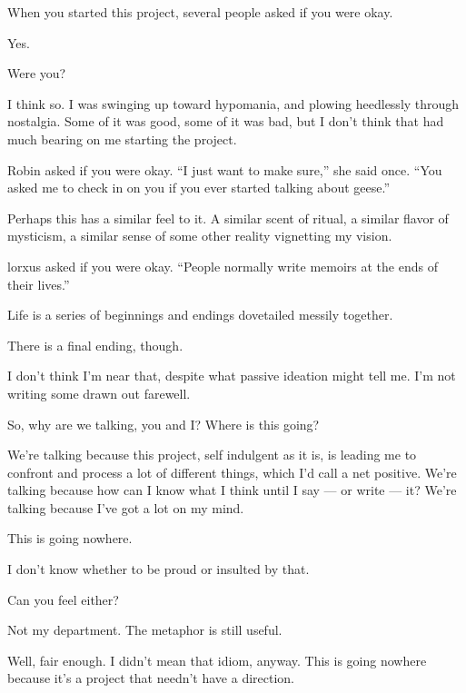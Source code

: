 \begin{ally}
When you started this project, several people asked if you were okay.
\end{ally}
Yes.

\begin{ally}
Were you?
\end{ally}
I think so. I was swinging up toward hypomania, and plowing heedlessly through nostalgia. Some of it was good, some of it was bad, but I don't think that had much bearing on me starting the project.

\begin{ally}
Robin asked if you were okay. ``I just want to make sure,'' she said once. ``You asked me to check in on you if you ever started talking about geese.''
\end{ally}
Perhaps this has a similar feel to it. A similar scent of ritual, a similar flavor of mysticism, a similar sense of some other reality vignetting my vision.

\begin{ally}
lorxus asked if you were okay. ``People normally write memoirs at the ends of their lives.''
\end{ally}
Life is a series of beginnings and endings dovetailed messily together.

\begin{ally}
There is a final ending, though.
\end{ally}
I don't think I'm near that, despite what passive ideation might tell me. I'm not writing some drawn out farewell.

\begin{ally}
So, why are we talking, you and I? Where is this going?
\end{ally}
We're talking because this project, self indulgent as it is, is leading me to confront and process a lot of different things, which I'd call a net positive. We're talking because how can I know what I think until I say --- or write --- it? We're talking because I've got a lot on my mind.

This is going nowhere.

\begin{ally}
I don't know whether to be proud or insulted by that.
\end{ally}
Can you feel either?

\begin{ally}
Not my department. The metaphor is still useful.
\end{ally}
Well, fair enough. I didn't mean that idiom, anyway. This is going nowhere because it's a project that needn't have a direction.

